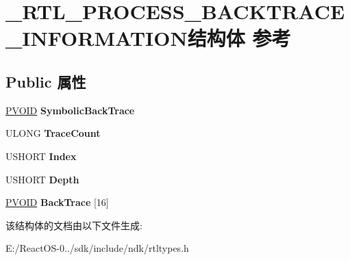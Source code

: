 \hypertarget{struct___r_t_l___p_r_o_c_e_s_s___b_a_c_k_t_r_a_c_e___i_n_f_o_r_m_a_t_i_o_n}{}\section{\+\_\+\+R\+T\+L\+\_\+\+P\+R\+O\+C\+E\+S\+S\+\_\+\+B\+A\+C\+K\+T\+R\+A\+C\+E\+\_\+\+I\+N\+F\+O\+R\+M\+A\+T\+I\+O\+N结构体 参考}
\label{struct___r_t_l___p_r_o_c_e_s_s___b_a_c_k_t_r_a_c_e___i_n_f_o_r_m_a_t_i_o_n}
\subsection*{Public 属性}
\begin{DoxyCompactItemize}
\item 
\mbox{\label{struct___r_t_l___p_r_o_c_e_s_s___b_a_c_k_t_r_a_c_e___i_n_f_o_r_m_a_t_i_o_n_a319e207715b6d7d940464491b12cb1e0}} 
\hyperlink{interfacevoid}{P\+V\+O\+ID} {\bfseries Symbolic\+Back\+Trace}
\item 
\mbox{\label{struct___r_t_l___p_r_o_c_e_s_s___b_a_c_k_t_r_a_c_e___i_n_f_o_r_m_a_t_i_o_n_aa5ab346133a80edf674c8cef46aaa8e9}} 
U\+L\+O\+NG {\bfseries Trace\+Count}
\item 
\mbox{\label{struct___r_t_l___p_r_o_c_e_s_s___b_a_c_k_t_r_a_c_e___i_n_f_o_r_m_a_t_i_o_n_a84f471924d8fe6801d45fdbd83911c17}} 
U\+S\+H\+O\+RT {\bfseries Index}
\item 
\mbox{\label{struct___r_t_l___p_r_o_c_e_s_s___b_a_c_k_t_r_a_c_e___i_n_f_o_r_m_a_t_i_o_n_ac4b9f0a5c08d2cc14cee413a2b3f4120}} 
U\+S\+H\+O\+RT {\bfseries Depth}
\item 
\mbox{\label{struct___r_t_l___p_r_o_c_e_s_s___b_a_c_k_t_r_a_c_e___i_n_f_o_r_m_a_t_i_o_n_ae3d38beb35f5bdf2a1b9f8b0ab0b708b}} 
\hyperlink{interfacevoid}{P\+V\+O\+ID} {\bfseries Back\+Trace} \mbox{[}16\mbox{]}
\end{DoxyCompactItemize}


该结构体的文档由以下文件生成\+:\begin{DoxyCompactItemize}
\item 
E\+:/\+React\+O\+S-\/0../sdk/include/ndk/rtltypes.\+h\end{DoxyCompactItemize}
